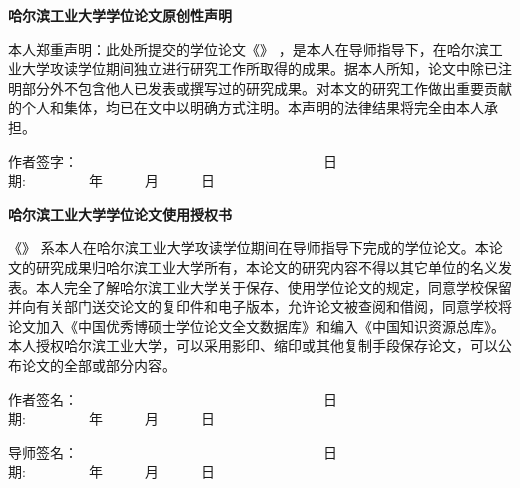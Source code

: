\newpage
{}

\vspace*{0.1cm}
\newcommand{\subchapterstyle}%
  {\CJKfamily{hei}\rmfamily\bfseries\fontsize{16bp}{16bp}\selectfont}

{}
\begin{center}{\subchapterstyle 哈尔滨工业大学\cxuewei 学位论文原创性声明}\end{center}

    本人郑重声明：此处所提交的\cxuewei 学位论文《\chinesethesistitle》 ，是本人在导师指导下，在哈尔滨工业大学攻读\cxuewei 学位期间独立进行研究工作所取得的成果。据本人所知，论文中除已注明部分外不包含他人已发表或撰写过的研究成果。对本文的研究工作做出重要贡献的个人和集体，均已在文中以明确方式注明。本声明的法律结果将完全由本人承担。

\begin{flushright}

作者签字：~~~~~~~~~~~~~~~~~~~~~~~~~~~~~~~~~~~日期:~~~~~~~~~年~~~~~~月~~~~~~日~~~~

\end{flushright}

{}
\begin{center}{\subchapterstyle 哈尔滨工业大学\cxuewei 学位论文使用授权书}\end{center}

    《\chinesethesistitle》 系本人在哈尔滨工业大学攻读\cxuewei 学位期间在导师指导下完成的\cxuewei 学位论文。本论文的研究成果归哈尔滨工业大学所有，本论文的研究内容不得以其它单位的名义发表。本人完全了解哈尔滨工业大学关于保存、使用学位论文的规定，同意学校保留并向有关部门送交论文的复印件和电子版本，允许论文被查阅和借阅，同意学校将论文加入《中国优秀博硕士学位论文全文数据库》和编入《中国知识资源总库》。本人授权哈尔滨工业大学，可以采用影印、缩印或其他复制手段保存论文，可以公布论文的全部或部分内容。

\begin{flushright}

作者签名：~~~~~~~~~~~~~~~~~~~~~~~~~~~~~~~~~~~日期:~~~~~~~~~年~~~~~~月~~~~~~日~~~~

导师签名：~~~~~~~~~~~~~~~~~~~~~~~~~~~~~~~~~~~日期:~~~~~~~~~年~~~~~~月~~~~~~日~~~~

\end{flushright}

